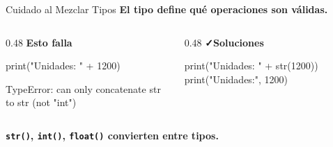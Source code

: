 \documentclass[aspectratio=169, 11pt]{beamer}
\begin{document}
\begin{frame}[fragile]{Cuidado al Mezclar Tipos}
  \vspace{-6pt}
  {\small\color{arcaDark}\bfseries
    El tipo define qué operaciones son válidas.}

  \vspace{3pt}
  \begin{columns}[T]
    \begin{column}{0.48\textwidth}
      {\scriptsize\color{arcaRed}\bfseries\faTimes\hspace{4pt}Esto falla}
      \vspace{2pt}
      \begin{pyblock}
print("Unidades: " + 1200)
      \end{pyblock}
      \vspace{-2pt}
      \begin{outputblock}
TypeError: can only concatenate
str to str (not "int")
      \end{outputblock}
    \end{column}

    \begin{column}{0.48\textwidth}
      {\scriptsize\color{codeGreen}\bfseries\faCheck\hspace{4pt}Soluciones}
      \vspace{2pt}
      \begin{pyblock}
print("Unidades: " + str(1200))
print("Unidades:", 1200)
      \end{pyblock}
    \end{column}
  \end{columns}

  \vspace{4pt}
  {\scriptsize\color{arcaDark}\bfseries
    \texttt{str()}, \texttt{int()}, \texttt{float()} convierten entre tipos.}
\end{frame}
\end{document}
